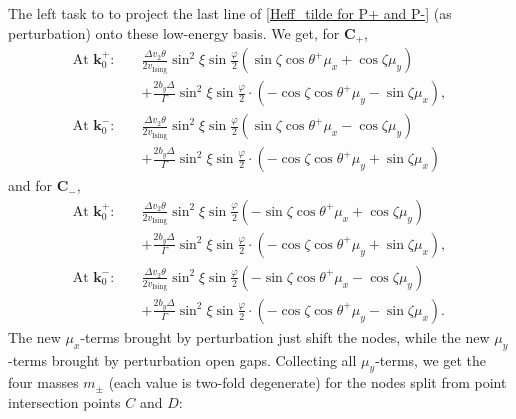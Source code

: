 \begin{subappendices}
	The left task to to project the last line of \eqref{Heff_tilde for P+ and P-} (as perturbation) onto these low-energy basis. We get, for $\bm{C}_+$,
	\begin{align}
		\text{At }\bm{k}_0^+:\quad & \frac{\Delta v_2\theta}{2v_{\text{Ising}}}\sin^2\xi\sin\frac{\varphi}{2}(\sin\zeta\cos\theta^+\mu_x+\cos\zeta\mu_y)\nonumber       \\
		                           & +\frac{2b_y\Delta}{\Gamma}\sin^2\xi\sin\frac{\varphi}{2}\cdot(-\cos\zeta\cos\theta^+\mu_y-\sin\zeta\mu_x),\label{H' for P+ at k0+} \\
		\text{At }\bm{k}_0^-:\quad & \frac{\Delta v_2\theta}{2v_{\text{Ising}}}\sin^2\xi\sin\frac{\varphi}{2}(\sin\zeta\cos\theta^+\mu_x-\cos\zeta\mu_y)\nonumber       \\
		                           & +\frac{2b_y\Delta}{\Gamma}\sin^2\xi\sin\frac{\varphi}{2}\cdot(-\cos\zeta\cos\theta^+\mu_y+\sin\zeta\mu_x)\label{H' for P+ at k0-}
	\end{align}
	and for $\bm{C}_-$,
	\begin{align}
		\text{At }\bm{k}_0^+:\quad & \frac{\Delta v_2\theta}{2v_{\text{Ising}}}\sin^2\xi\sin\frac{\varphi}{2}(-\sin\zeta\cos\theta^+\mu_x+\cos\zeta\mu_y)\nonumber      \\
		                           & +\frac{2b_y\Delta}{\Gamma}\sin^2\xi\sin\frac{\varphi}{2}\cdot(-\cos\zeta\cos\theta^+\mu_y+\sin\zeta\mu_x),\label{H' for P- at k0+} \\
		\text{At }\bm{k}_0^-:\quad & \frac{\Delta v_2\theta}{2v_{\text{Ising}}}\sin^2\xi\sin\frac{\varphi}{2}(-\sin\zeta\cos\theta^+\mu_x-\cos\zeta\mu_y)\nonumber      \\
		                           & +\frac{2b_y\Delta}{\Gamma}\sin^2\xi\sin\frac{\varphi}{2}\cdot(-\cos\zeta\cos\theta^+\mu_y-\sin\zeta\mu_x).\label{H' for P- at k0-}
	\end{align}
	The new $\mu_x$-terms brought by perturbation just shift the nodes, while the new $\mu_y$-terms brought by perturbation open gaps. Collecting all $\mu_y$-terms, we get the four masses $m_\pm$ (each value is two-fold degenerate) for the nodes split from point intersection points $C$ and $D$:


\end{subappendices}
